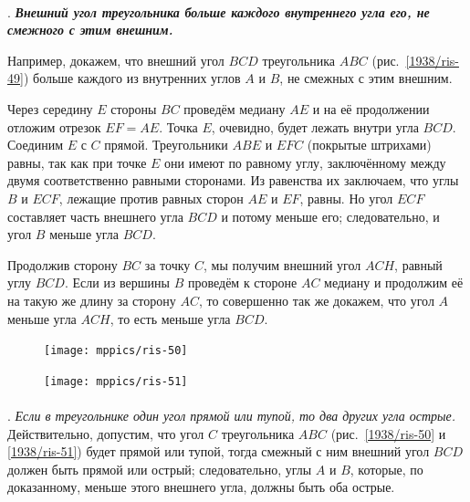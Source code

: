 \paragraph{}\label{1938/44}
\mbox{.}
\textbf{\emph{Внешний угол треугольника больше каждого внутреннего угла его, не смежного с этим внешним.}}


Например, докажем, что внешний угол $BCD$ треугольника $ABC$
(рис.~\ref{1938/ris-49}) больше каждого из внутренних углов $A$ и $B$, не смежных с этим внешним.

Через середину $E$ стороны $BC$ проведём медиану $AE$ и на её продолжении отложим отрезок $EF=AE$.
Точка $E$, очевидно, будет лежать внутри угла $BCD$.
Соединим $E$ с $C$ прямой.
Треугольники $ABE$ и $EFC$ (покрытые штрихами) равны, так как при точке $E$ они имеют по равному углу, заключённому между двумя соответственно равными сторонами.
Из равенства их заключаем, что углы $B$ и $ECF$, лежащие против равных сторон $AE$ и $EF$, равны.
Но угол $ECF$ составляет часть внешнего угла $BCD$ и потому меньше его;
следовательно, и угол $B$ меньше угла $BCD$.



Продолжив сторону $BC$ за точку $C$, мы получим внешний угол $ACH$, равный углу $BCD$.
Если из вершины $B$ проведём к стороне $AC$ медиану и продолжим её на такую же длину за сторону $AC$, то совершенно так же докажем, что угол $A$ меньше угла $ACH$, то есть меньше угла $BCD$.

{

\begin{figure}
\vskip-0mm
\begin{minipage}{28mm}
\centering
\texttt{[image: mppics/ris-50]}
\end{minipage}\hfill
\begin{minipage}{28mm}
\centering
\texttt{[image: mppics/ris-51]}
\end{minipage}
\medskip
\begin{minipage}{28mm}
\centering
\caption{}\label{1914/ris-50}
\end{minipage}\hfill
\begin{minipage}{28mm}
\centering
\caption{}\label{1914/ris-51}
\end{minipage}

\end{figure}

\paragraph{}\label{1938/45}
\mbox{.}
\emph{Если в треугольнике один угол прямой или тупой, то два других угла острые.}
Действительно, допустим, что угол $C$ треугольника $ABC$ 
(рис.~\ref{1938/ris-50} и \ref{1938/ris-51}) будет прямой или тупой, тогда смежный с ним внешний угол $BCD$ должен быть прямой или острый;
следовательно, углы $A$ и $B$, которые, по доказанному, меньше этого внешнего угла, должны быть оба острые.

}

